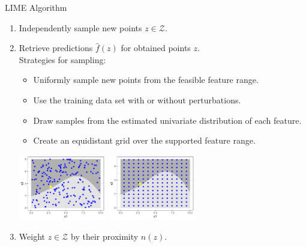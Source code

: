 \documentclass[aspectratio=169]{../latex_main/tntbeamer}  %
\begin{document}
\begin{frame}{LIME Algorithm }

        \vspace{-2em}	
		\begin{enumerate}
		\item Independently sample new points $z \in \mathcal{Z}$. 
		\item Retrieve predictions $\hat{f}(z)$ for obtained points $z$. \\[0.2cm]
		
		\hspace{-0.7cm} Strategies for sampling: 
		\begin{itemize} 
			\item Uniformly sample new points from the feasible feature range. 
			\item Use the training data set with or without perturbations.
			\item Draw samples from the estimated univariate distribution of each feature.
			\item Create an equidistant grid over the supported feature range.  
		\end{itemize}
		\begin{center}
			\includegraphics[width=0.3\textwidth]{figure/lime3} \hspace{0.1cm}
			\includegraphics[width=0.3\textwidth]{figure/lime3a}
		\end{center}
		\item Weight $z \in \mathcal{Z}$ by their proximity $n(z)$.
		\\[0.2cm]
		\end{enumerate}

\end{frame}
\end{document}
